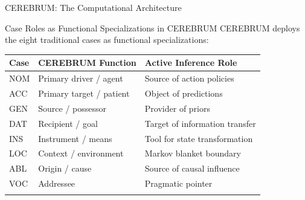 \documentclass[
  ignorenonframetext,
]{beamer}
\newcounter{none} %
\begin{document}
\begin{frame}{CEREBRUM: The Computational Architecture}
\begin{block}{Case Roles as Functional Specializations in CEREBRUM}
\protect{}\label{case-roles-as-functional-specializations-in-cerebrum}
CEREBRUM deploys the eight traditional cases as functional
specializations:

{\def\LTcaptype{none} %
\begin{longtable}[]{@{}lll@{}}
\toprule\noalign{}
Case & CEREBRUM Function & Active Inference Role \\
\midrule\noalign{}
\endhead
NOM & Primary driver / agent & Source of action policies \\
ACC & Primary target / patient & Object of predictions \\
GEN & Source / possessor & Provider of priors \\
DAT & Recipient / goal & Target of information transfer \\
INS & Instrument / means & Tool for state transformation \\
LOC & Context / environment & Markov blanket boundary \\
ABL & Origin / cause & Source of causal influence \\
VOC & Addressee & Pragmatic pointer \\
\bottomrule\noalign{}
\end{longtable}
}
\end{block}
\end{frame}
\end{document}
